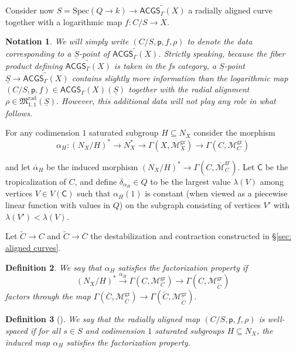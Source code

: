 \documentclass{article}
\def\cM{{\overline{\mathcal{M}}}}
\def\oM{\overline{\mathcal{M}}}
\def\cM{{\mathcal{M}}}
\newtheorem{definition}{Definition}[section]
\newtheorem{notation}[definition]{Notation}
\newcommand{\gr}{\mathrm{gr}}
\begin{document}
Consider now $S= \mathrm{Spec}(Q \to k) \to \widetilde{\mathsf{ACGS}_{\Gamma}(X)}$ a radially aligned curve together with a logarithmic map $f: C/S \to X$. 

\begin{notation}\label{not: well-spaced maps}
   We will simply write $(C/S,\mathsf{p},f,\rho)$ to denote the data corresponding to a $\underline{S}$-point of $\widetilde{\mathsf{ACGS}_{\Gamma}(X)}$. Strictly speaking, because the fiber product defining 
$
\widetilde{\mathsf{ACGS}_{\Gamma}(X)}
$ 
is taken in the fs category, a $\underline{S}$-point
$
\underline{S} \to \widetilde{\mathsf{ACGS}_{\Gamma}(X)}
$
contains slightly more information than the logarithmic map
$
(C/S,\mathsf{p},f)\in \mathsf{ACGS}_{\Gamma}(X)(\underline{S})
$
together with the radial alignment
$
\rho\in \mathfrak{M}_{1,1}^{\mathrm{rad}}(\underline{S}).
$
However, this additional data will not play any role in what follows.
\end{notation}


For any codimension $1$ saturated subgroup $H \subseteq N_X$ consider the morphism
$$
\alpha_H: (N_X/H)^* \to N_X^* \to \Gamma(X,\cM_{X}^{\gr}) \to \Gamma(C,\cM_{C}^{\gr})
$$

and let $\overline{\alpha}_H$ be the induced morphism $(N_X/H)^* \to \Gamma(C,\oM_{C}^{\gr})$. Let $\mathsf{C}$ be the tropicalization of $C$, and define
$ \delta_{\alpha_H} \in Q$
to be the largest value $\lambda(V)$ among vertices $V \in V(\mathsf{C})$ such that $\alpha_H(1)$ is constant (when viewed as a piecewise linear function with values in $Q$) on the subgraph consisting of vertices $V'$ with $\lambda(V') < \lambda(V)$.

Let $\widetilde{C} \to C$ and $\widetilde{C} \to \overline{C}$ the destabilization and contraction constructed in \S\ref{sec: aligned curves}. 

\begin{definition} \label{def: factorization}
We say that $\alpha_H$ satisfies the factorization property if 
$$
(N_X/H)^* \xrightarrow{\alpha_H} \Gamma(C,\cM_{C}^{\gr}) \to \Gamma(C,\cM_{\widetilde{C}}^{\gr})
$$
factors through the map
$
\Gamma(\overline{C}, \cM_{\overline{C}}^{\gr}) \longrightarrow \Gamma(\widetilde{C}, \cM_{\widetilde{C}}^{\gr}).
$
\end{definition}

\begin{definition}[{\cite[Definition 3.4.1]{RSWII}}]
    We say that the radially aligned map $(C/S,\mathsf{p},f,\rho)$ 
    is well-spaced if for all $s \in S$ and codimension $1$ saturated subgroups $H \subseteq N_X$, the induced map $\alpha_H$ satisfies the factorization property.
\end{definition}
\end{document}
